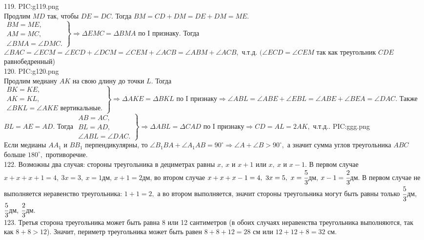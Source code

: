 119. {{PIC:g119.png}}\\
Продлим $MD$ так, чтобы $DE=DC.$ Тогда $BM=CD+DM=DE+DM=ME.$\\ $\left.\begin{array}{l}BM=ME,\\
AM=MC,\\
\angle BMA=\angle DMC. \end{array}\right\}\Rightarrow \Delta EMC=\Delta BMA\text{ по I признаку.}$ Тогда
$\angle BAC=\angle ECM=\angle ECD+\angle DCM=\angle CEM+\angle ACB=\angle ABM+\angle ACB,$ ч.т.д. $(\angle ECD=\angle CEM$ так как треугольник $CDE$ равнобедренный)\\
120. {{PIC:g120.png}}\\
Продлим медиану $AK$ на свою длину до точки $L.$ Тогда $\left.\begin{array}{l}BK=KE,\\
AK=KL,\\
\angle BKL=\angle AKE\text{ вертикальные.} \end{array}\right\}\Rightarrow \Delta AKE=\Delta BKL\text{ по I признаку}\Rightarrow
\angle ABL=\angle ABE+\angle EBL=\angle ABE+\angle BEA=\angle DAC.$ Также  $BL=AE=AD.$ Тогда
$\left.\begin{array}{l}AB=AC,\\
BL=AD,\\
\angle ABL=\angle DAC. \end{array}\right\}\Rightarrow \Delta ABL=\Delta CAD\text{ по I признаку}\Rightarrow CD=AL=2AK,$ ч.т.д.\newpage{}. {{PIC:ggg.png}}\\
Если медианы $AA_1$ и $BB_1$ перпендикулярны, то $\angle B_1BA+\angle A_1AB=90^\circ\Rightarrow\angle A+\angle B>90^\circ,$ а значит сумма углов треугольника $ABC$ больше $180^\circ,$ противоречие.\\
122. Возможны два случая: стороны треугольника в дециметрах равны $x,\ x$ и $x+1$ или $x,\ x$ и $x-1.$ В первом случае $x+x+x+1=4,\ 3x=3,\ x=1$дм, $x+1=2$дм, во втором случае $x+x+x-1=4,\ 3x=5,\ x=\cfrac{5}{3}$дм, $x-1=\cfrac{2}{3}$дм. В первом случае не выполняется неравенство треугольника: $1+1=2,$ а во втором выполняется, значит стороны треугольника могут быть равны только $\cfrac{5}{3}$дм, $\cfrac{5}{3}$дм, $\cfrac{2}{3}$дм.\\
123. Третья сторона треугольника может быть равна 8 или 12 сантиметров (в обоих случаях неравенства треугольника выполняются, так как $8+8>12$). Значит, периметр треугольника может быть равен $8+8+12=28$ см или $12+12+8=32$ см.\\
